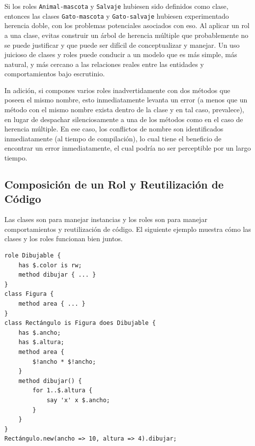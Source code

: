 Si los roles {\tt Animal-mascota} y {\tt Salvaje} hubiesen sido 
definidos como clase, entonces las clases {\tt Gato-mascota} y
{\tt Gato-salvaje} hubiesen experimentado herencia doble,
con los problemas potenciales asociados con eso. Al aplicar
un rol a una clase, evitas construir un árbol de herencia múltiple
que probablemente no se puede justificar y que puede ser difícil de
conceptualizar y manejar. Un uso juicioso de clases y roles puede 
conducir a un modelo que es más simple, más natural, y más cercano
a las relaciones reales entre las entidades y comportamientos 
bajo escrutinio.


In adición, si compones varios roles inadvertidamente con dos
métodos que poseen el mismo nombre, esto inmediatamente levanta
un error (a menos que un método con el mismo nombre exista dentro
de la clase y en tal caso, prevalece), en lugar de despachar silenciosamente
a una de los métodos como en el caso de herencia múltiple. En 
ese caso, los conflictos de nombre son identificados inmediatamente
(al tiempo de compilación), lo cual tiene el beneficio de 
encontrar un error inmediatamente, el cual podría no ser
perceptible por un largo tiempo.

\subsection{Composición de un Rol y Reutilización de Código}

Las clases son para manejar instancias y los roles son para
manejar comportamientos y reutilización de código. El siguiente
ejemplo muestra cómo las clases y los roles funcionan bien juntos.

\begin{verbatim}
role Dibujable {
    has $.color is rw;
    method dibujar { ... }
}
class Figura {
    method area { ... }
}
class Rectángulo is Figura does Dibujable {
    has $.ancho;
    has $.altura;
    method area {
        $!ancho * $!ancho;
    }
    method dibujar() {
        for 1..$.altura {
            say 'x' x $.ancho;
        }
    }
}
Rectángulo.new(ancho => 10, altura => 4).dibujar;
\end{verbatim}

